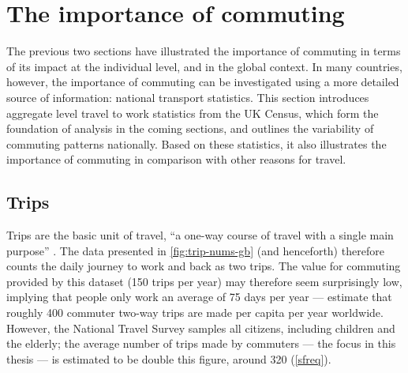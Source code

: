 \section{The importance of commuting} \label{snimportance}
The previous two sections have illustrated the importance of commuting
in terms of its impact at the individual level,
and in the global context. In many countries, however, the importance of
commuting can be investigated using a more detailed source of information:
national transport statistics. This section introduces
aggregate level travel to work statistics from the UK Census,
which form the foundation of analysis in the coming sections, and outlines
the variability of commuting patterns nationally.
Based on these statistics, it also illustrates the importance of
commuting in comparison with other reasons for travel.

% 



\subsection{Trips}
Trips are the basic unit of travel, ``a one-way course of travel
with a single main purpose'' \citep[p.~6]{Dft2011-notes}. The data presented in
\cref{fig:trip-nums-gb} (and henceforth)
therefore counts the daily journey to work and
back as two trips. The value for commuting provided by this dataset
(150 trips per year) may therefore
seem surprisingly low, implying that people only work an average of 75 days per year
--- \citet{hall2011tourism} estimate that roughly
400 commuter two-way trips are made per capita
per year worldwide. However,
the National Travel Survey samples all citizens, including children and the
elderly; the average number of trips made by commuters --- the focus in this
thesis --- is estimated to be double this figure, around 320 (\cref{sfreq}).

